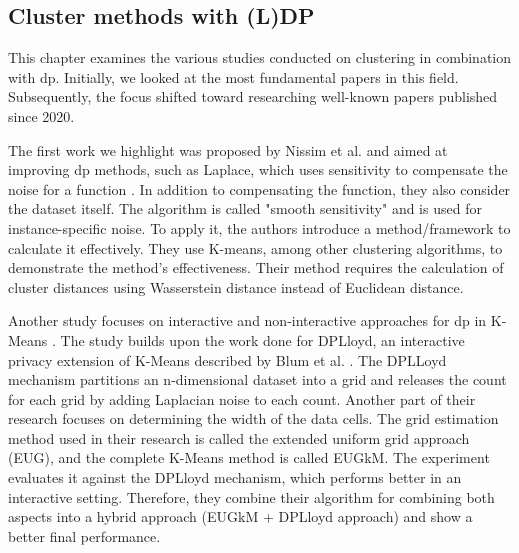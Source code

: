 \subsection{Cluster methods with (L)DP}
This chapter examines the various studies conducted on clustering in combination with \gls{dp}.
Initially, we looked at the most fundamental papers in this field. Subsequently, the focus shifted toward researching well-known papers published since 2020. \newline

The first work we highlight was proposed by Nissim et al. and aimed at improving \gls{dp} methods, such as Laplace, which uses sensitivity to compensate the noise for a function \citep{nissim_smooth_2007}.
In addition to compensating the function, they also consider the dataset itself.
The algorithm is called "smooth sensitivity" and is used for instance-specific noise.
To apply it, the authors introduce a method/framework to calculate it effectively.
They use K-means, among other clustering algorithms, to demonstrate the method's effectiveness.
Their method requires the calculation of cluster distances using Wasserstein distance instead of Euclidean distance.

Another study focuses on interactive and non-interactive approaches for \gls{dp} in K-Means \citep{su_differentially_2015}.
The study builds upon the work done for DPLloyd, an interactive privacy extension of K-Means described by Blum et al. \citep{blum_practical_2005}.
The DPLLoyd mechanism partitions an n-dimensional dataset into a grid and releases the count for each grid by adding Laplacian noise to each count.
Another part of their research focuses on determining the width of the data cells.
The grid estimation method used in their research is called the extended uniform grid approach (EUG), and the complete K-Means method is called EUGkM.
The experiment evaluates it against the DPLloyd mechanism, which performs better in an interactive setting.
Therefore, they combine their algorithm for combining both aspects into a hybrid approach (EUGkM + DPLloyd approach) and show a better final performance.

